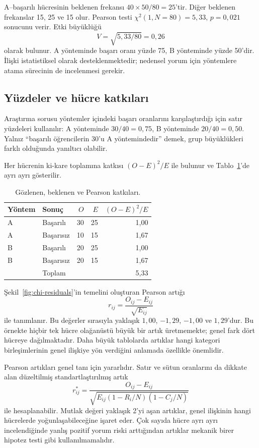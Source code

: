 A--başarılı hücresinin beklenen frekansı $40\times50/80=25$'tir. Diğer
beklenen frekanslar 15, 25 ve 15 olur. Pearson testi
$\chi^2(1,N=80)=5{,}33$, $p=0{,}021$ sonucunu verir. Etki büyüklüğü
\[
V=\sqrt{5{,}33/80}=0{,}26
\]
olarak bulunur. A yönteminde başarı oranı yüzde 75, B yönteminde yüzde 50'dir.
İlişki istatistiksel olarak desteklenmektedir; nedensel yorum için yöntemlere
atama sürecinin de incelenmesi gerekir.

\subsection{Yüzdeler ve hücre katkıları}

Araştırma sorusu yöntemler içindeki başarı oranlarını karşılaştırdığı için
satır yüzdeleri kullanılır: A yönteminde $30/40=0{,}75$, B yönteminde
$20/40=0{,}50$. Yalnız ``başarılı öğrencilerin 30'u A yöntemindedir'' demek,
grup büyüklükleri farklı olduğunda yanıltıcı olabilir.

Her hücrenin ki-kare toplamına katkısı $(O-E)^2/E$ ile bulunur ve
Tablo~\ref{tab:chi-cell-contributions}'de ayrı ayrı gösterilir.

\begin{table}[H]
\centering
\caption{Gözlenen, beklenen ve Pearson katkıları.}
\label{tab:chi-cell-contributions}
\begin{tabular}{llrrr}
\toprule
Yöntem & Sonuç & $O$ & $E$ & $(O-E)^2/E$ \\
\midrule
A & Başarılı   & 30 & 25 & 1,00 \\
A & Başarısız  & 10 & 15 & 1,67 \\
B & Başarılı   & 20 & 25 & 1,00 \\
B & Başarısız  & 20 & 15 & 1,67 \\
\midrule
 & Toplam & & & 5,33 \\
\bottomrule
\end{tabular}
\end{table}

Şekil~\ref{fig:chi-residuals}'in temelini oluşturan Pearson artığı
\[
r_{ij}=\frac{O_{ij}-E_{ij}}{\sqrt{E_{ij}}}
\]
ile tanımlanır. Bu değerler sırasıyla yaklaşık $1{,}00$, $-1{,}29$,
$-1{,}00$ ve $1{,}29$'dur. Bu örnekte hiçbir tek hücre olağanüstü büyük bir
artık üretmemekte; genel fark dört hücreye dağılmaktadır. Daha büyük tablolarda
artıklar hangi kategori birleşimlerinin genel ilişkiye yön verdiğini anlamada
özellikle önemlidir.

Pearson artıkları genel tanı için yararlıdır. Satır ve sütun oranlarını da
dikkate alan düzeltilmiş standartlaştırılmış artık
\[
r_{ij}^{\ast}=\frac{O_{ij}-E_{ij}}
{\sqrt{E_{ij}(1-R_i/N)(1-C_j/N)}}
\]
ile hesaplanabilir. Mutlak değeri yaklaşık 2'yi aşan artıklar, genel ilişkinin
hangi hücrelerde yoğunlaşabileceğine işaret eder. Çok sayıda hücre ayrı ayrı
incelendiğinde yanlış pozitif yorum riski arttığından artıklar mekanik birer
hipotez testi gibi kullanılmamalıdır.

